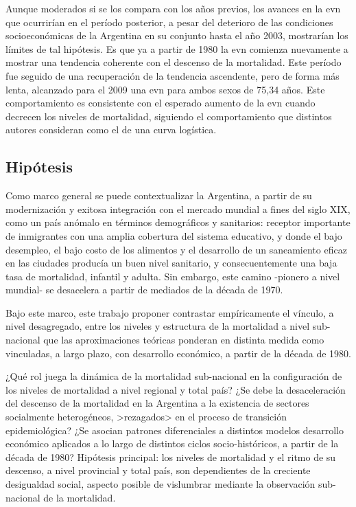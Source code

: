 \documentclass[12pt,spanish,]{article}
\begin{document}
Aunque moderados si se los compara con los años previos, los avances en
la \gls{evn} que ocurrirían en el período posterior, a pesar del
deterioro de las condiciones socioeconómicas de la Argentina en su
conjunto hasta el año 2003, mostrarían los límites de tal hipótesis. Es
que ya a partir de 1980 la \gls{evn} comienza nuevamente a mostrar una
tendencia coherente con el descenso de la mortalidad. Este período fue
seguido de una recuperación de la tendencia ascendente, pero de forma
más lenta, alcanzado para el 2009 una \gls{evn} para ambos sexos de
75,34 años. Este comportamiento es consistente con el esperado aumento
de la \gls{evn} cuando decrecen los niveles de mortalidad, siguiendo el
comportamiento que distintos autores consideran como el de una curva
logística.

\hypertarget{sec:hip}{%
\subsection{Hipótesis}\label{sec:hip}}

Como marco general se puede contextualizar la Argentina, a partir de su
modernización y exitosa integración con el mercado mundial a fines del
siglo XIX, como un país anómalo en términos demográficos y sanitarios:
receptor importante de inmigrantes con una amplia cobertura del sistema
educativo, y donde el bajo desempleo, el bajo costo de los alimentos y
el desarrollo de un saneamiento eficaz en las ciudades producía un buen
nivel sanitario, y consecuentemente una baja tasa de mortalidad,
infantil y adulta. Sin embargo, este camino -pionero a nivel mundial- se
desacelera a partir de mediados de la década de 1970.

Bajo este marco, este trabajo proponer contrastar empíricamente el
vínculo, a nivel desagregado, entre los niveles y estructura de la
mortalidad a nivel sub-nacional que las aproximaciones teóricas ponderan
en distinta medida como vinculadas, a largo plazo, con desarrollo
económico, a partir de la década de 1980.

¿Qué rol juega la dinámica de la mortalidad sub-nacional en la
configuración de los niveles de mortalidad a nivel regional y total
país? ¿Se debe la desaceleración del descenso de la mortalidad en la
Argentina a la existencia de sectores socialmente heterogéneos,
\textgreater{}rezagados\textgreater{} en el proceso de transición
epidemiológica? ¿Se asocian patrones diferenciales a distintos modelos
desarrollo económico aplicados a lo largo de distintos ciclos
socio-históricos, a partir de la década de 1980? Hipótesis principal:
los niveles de mortalidad y el ritmo de su descenso, a nivel provincial
y total país, son dependientes de la creciente desigualdad social,
aspecto posible de vislumbrar mediante la observación sub-nacional de la
mortalidad.
\end{document}
